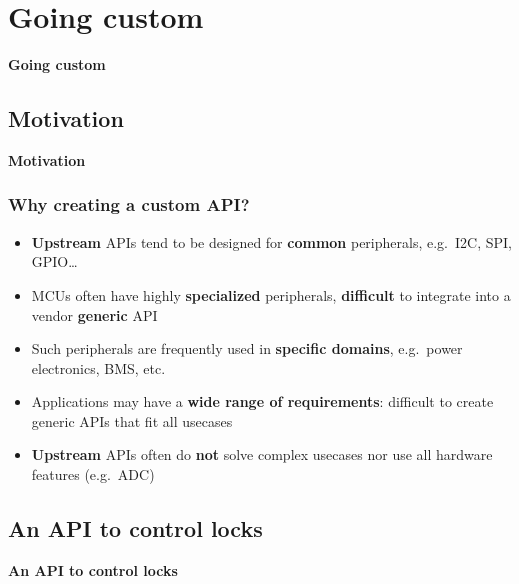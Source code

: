 \documentclass[handout]{beamer}
\begin{document}
\section{Going custom}

\begin{frame}
  \begin{center}
    \Huge \textbf{Going custom}
  \end{center}
\end{frame}

\subsection{Motivation}

\begin{frame}
  \begin{center}
    \Large \textbf{Motivation}
  \end{center}
\end{frame}

\begin{frame}
  \frametitle{Why creating a custom API?}

  \begin{itemize}
    \item \textbf{Upstream} APIs tend to be designed for \textbf{common}
          peripherals, e.g.\ I2C, SPI, GPIO\ldots
    \item MCUs often have highly \textbf{specialized} peripherals,
          \textbf{difficult} to integrate into a vendor \textbf{generic} API
    \item Such peripherals are frequently used in \textbf{specific domains},
          e.g.\ power electronics, BMS, etc.
    \item Applications may have a \textbf{wide range of requirements}:
          difficult to create generic APIs that fit all usecases
    \item \textbf{Upstream} APIs often do \textbf{not} solve complex usecases
          nor use all hardware features (e.g.\ ADC)
  \end{itemize}
\end{frame}

\subsection{An API to control locks}

\begin{frame}
  \begin{center}
    \Large \textbf{An API to control locks}
  \end{center}
\end{frame}
\end{document}
